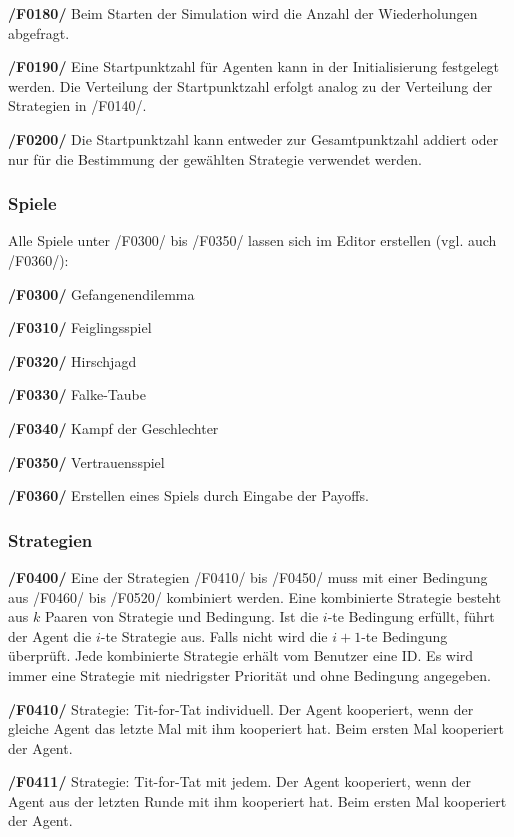 \textbf{/F0180/}
Beim Starten der Simulation wird die Anzahl der Wiederholungen abgefragt.

\textbf{/F0190/}
Eine Startpunktzahl für Agenten kann in der Initialisierung festgelegt werden. Die Verteilung der Startpunktzahl erfolgt analog zu der Verteilung der Strategien in /F0140/.

\textbf{/F0200/}
Die Startpunktzahl kann entweder zur Gesamtpunktzahl addiert oder nur für die Bestimmung der gewählten Strategie verwendet werden.

\subsubsection{Spiele}
Alle Spiele unter /F0300/ bis /F0350/ lassen sich im Editor erstellen (vgl. auch /F0360/):

\textbf{/F0300/} 
Gefangenendilemma

\textbf{/F0310/} 
Feiglingsspiel

\textbf{/F0320/} 
Hirschjagd

\textbf{/F0330/} 
Falke-Taube

\textbf{/F0340/} 
Kampf der Geschlechter

\textbf{/F0350/} 
Vertrauensspiel

\textbf{/F0360/} 
Erstellen eines Spiels durch Eingabe der Payoffs.

\subsubsection{Strategien}

\textbf{/F0400/}
Eine der Strategien /F0410/ bis /F0450/ muss mit einer Bedingung aus /F0460/ bis /F0520/ kombiniert werden. Eine kombinierte Strategie besteht aus $k$ Paaren von Strategie und Bedingung. Ist die $i$-te Bedingung erfüllt, führt der Agent die $i$-te Strategie aus. Falls nicht wird die $i+1$-te Bedingung überprüft. Jede kombinierte Strategie erhält vom Benutzer eine ID. {\color{red}Es wird immer eine Strategie mit niedrigster Priorität und ohne Bedingung angegeben.}

\textbf{/F0410/} 
Strategie: Tit-for-Tat individuell. Der Agent kooperiert, wenn der gleiche Agent das letzte Mal mit ihm kooperiert hat. Beim ersten Mal kooperiert der Agent.

\textbf{/F0411/}
Strategie: Tit-for-Tat mit jedem. Der Agent kooperiert, wenn der Agent aus der letzten Runde mit ihm kooperiert hat. Beim ersten Mal kooperiert der Agent.

